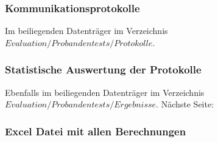 \documentclass[
	12pt,
	a4paper,
	bibtotoc,
	cleardoubleempty, 
	idxtotoc,
	ngerman,
	openright
	final,
	listof=nochaptergap,
	]{scrbook}
\begin{document}
\begin{appendices}
\subsubsection{Kommunikationsprotokolle}\label{sec:append_study_protocols}
Im beiliegenden Datenträger im Verzeichnis $Evaluation/Probandentests/Protokolle$. 

\subsubsection{Statistische Auswertung der Protokolle}
Ebenfalls im beiliegenden Datenträger im Verzeichnis $Evaluation/Probandentests/Ergebnisse$. 
Nächste Seite:



\subsubsection{Excel Datei mit allen Berechnungen}




% 
% 
\end{appendices}
\end{document}
